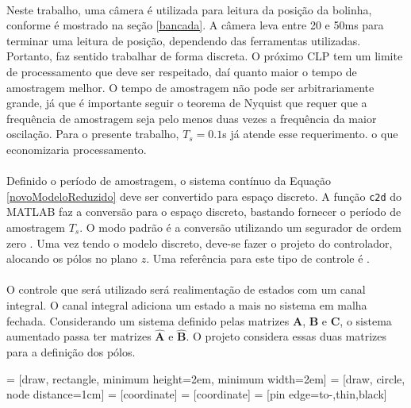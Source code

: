 \paragraph{} Neste trabalho, uma câmera é utilizada para leitura da posição da bolinha, conforme é mostrado na seção \ref{bancada}. A câmera leva entre 20 e 50ms para terminar uma leitura de posição, dependendo das ferramentas utilizadas. Portanto, faz sentido trabalhar de forma discreta. O próximo CLP tem um limite de processamento que deve ser respeitado, daí quanto maior o tempo de amostragem melhor. O tempo de amostragem não pode ser arbitrariamente grande, já que é importante seguir o teorema de Nyquist \cite{Ogata:2010} que requer que a frequência de amostragem seja pelo menos duas vezes a frequência da maior oscilação. Para o presente trabalho, $T_s = 0.1$s já atende esse requerimento. o que economizaria processamento.

\paragraph{} Definido o período de amostragem, o sistema contínuo da Equação \ref{novoModeloReduzido} deve ser convertido para espaço discreto. A função \texttt{c2d} do MATLAB \cite{c2d} faz a conversão para o espaço discreto, bastando fornecer o período de amostragem $T_s$. O modo padrão é a conversão utilizando um segurador de ordem zero \cite{OgataDiscrete:1995}. Uma vez tendo o modelo discreto, deve-se fazer o projeto do controlador, alocando os pólos no plano $z$. Uma referência para este tipo de controle é \cite{OgataDiscrete:1995}.

\paragraph{} O controle que será utilizado será realimentação de estados com um canal integral. O canal integral adiciona um estado a mais no sistema em malha fechada. Considerando um sistema definido pelas matrizes $\mathbf{A}$, $\mathbf{B}$ e $\mathbf{C}$, o sistema aumentado passa ter matrizes $\mathbf{\hat{A}}$ e $\mathbf{\hat{B}}$. O projeto considera essas duas matrizes para a definição dos pólos.

 = [draw, rectangle, 
minimum height=2em, minimum width=2em]
 = [draw, circle, node distance=1cm]
 = [coordinate]
 = [coordinate]
 = [pin edge={to-,thin,black}]

